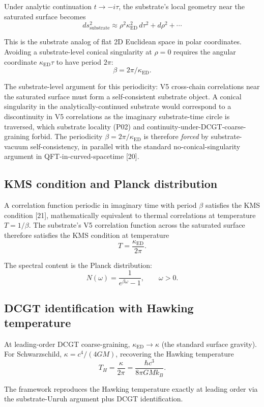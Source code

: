 \documentclass[11pt,a4paper]{article}
\begin{document}
Under analytic continuation $t \to -i\tau$, the substrate's local geometry near the saturated surface becomes
\[
ds^2_{\mathrm{substrate}} \approx \rho^2 \kappa_{\mathrm{ED}}^2 \, d\tau^2 + d\rho^2 + \cdots
\]

This is the substrate analog of flat 2D Euclidean space in polar coordinates. Avoiding a substrate-level conical singularity at $\rho = 0$ requires the angular coordinate $\kappa_{\mathrm{ED}}\tau$ to have period $2\pi$:
\[
\beta = 2\pi/\kappa_{\mathrm{ED}}.
\]

The substrate-level argument for this periodicity: V5 cross-chain correlations near the saturated surface must form a self-consistent substrate object. A conical singularity in the analytically-continued substrate would correspond to a discontinuity in V5 correlations as the imaginary substrate-time circle is traversed, which substrate locality (P02) and continuity-under-DCGT-coarse-graining forbid. The periodicity $\beta = 2\pi/\kappa_{\mathrm{ED}}$ is therefore \emph{forced} by substrate-vacuum self-consistency, in parallel with the standard no-conical-singularity argument in QFT-in-curved-spacetime [20].

\subsection{KMS condition and Planck distribution}

A correlation function periodic in imaginary time with period $\beta$ satisfies the KMS condition [21], mathematically equivalent to thermal correlations at temperature $T = 1/\beta$. The substrate's V5 correlation function across the saturated surface therefore satisfies the KMS condition at temperature
\[
T = \frac{\kappa_{\mathrm{ED}}}{2\pi}.
\]

The spectral content is the Planck distribution:
\[
N(\omega) = \frac{1}{e^{\beta\omega} - 1}, \qquad \omega > 0.
\]

\subsection{DCGT identification with Hawking temperature}

At leading-order DCGT coarse-graining, $\kappa_{\mathrm{ED}} \to \kappa$ (the standard surface gravity). For Schwarzschild, $\kappa = c^4/(4 G M)$, recovering the Hawking temperature
\[
T_H = \frac{\kappa}{2\pi} = \frac{\hbar c^3}{8\pi G M k_B}.
\]

The framework reproduces the Hawking temperature exactly at leading order via the substrate-Unruh argument plus DCGT identification.
\end{document}
